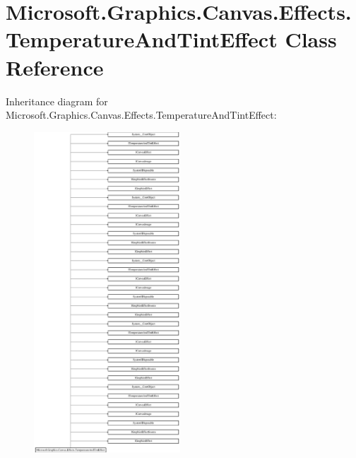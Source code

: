 \hypertarget{class_microsoft_1_1_graphics_1_1_canvas_1_1_effects_1_1_temperature_and_tint_effect}{}\section{Microsoft.\+Graphics.\+Canvas.\+Effects.\+Temperature\+And\+Tint\+Effect Class Reference}
\label{class_microsoft_1_1_graphics_1_1_canvas_1_1_effects_1_1_temperature_and_tint_effect}
Inheritance diagram for Microsoft.\+Graphics.\+Canvas.\+Effects.\+Temperature\+And\+Tint\+Effect\+:\begin{figure}[H]
\begin{center}
\leavevmode
\includegraphics[height=12.000000cm]{class_microsoft_1_1_graphics_1_1_canvas_1_1_effects_1_1_temperature_and_tint_effect}
\end{center}
\end{figure}
